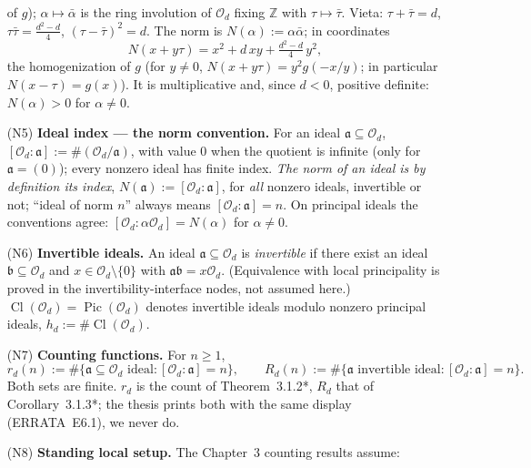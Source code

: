 \begin{definition}
\begin{enumerate}
      of $g$); $\alpha \mapsto \bar\alpha$ is the ring involution of $\mathcal{O}_d$ fixing
      $\mathbb{Z}$ with $\tau \mapsto \bar\tau$. Vieta: $\tau + \bar\tau = d$,
      $\tau\bar\tau = \frac{d^2 - d}{4}$, $(\tau - \bar\tau)^2 = d$. The norm is
      $N(\alpha) := \alpha\bar\alpha$; in coordinates
      \[
        N(x + y\tau) = x^2 + d\,xy + \tfrac{d^2 - d}{4}\,y^2,
      \]
      the homogenization of $g$ (for $y \neq 0$, $N(x + y\tau) = y^2 g(-x/y)$; in
      particular $N(x - \tau) = g(x)$). It is multiplicative and, since $d < 0$, positive
      definite: $N(\alpha) > 0$ for $\alpha \neq 0$.
    \item[(N5)] \textbf{Ideal index --- the norm convention.} For an ideal
      $\mathfrak{a} \subseteq \mathcal{O}_d$,
      $[\mathcal{O}_d : \mathfrak{a}] := \#(\mathcal{O}_d/\mathfrak{a})$, with value $0$
      when the quotient is infinite (only for $\mathfrak{a} = (0)$); every nonzero ideal
      has finite index. \emph{The norm of an ideal is by definition its index},
      $N(\mathfrak{a}) := [\mathcal{O}_d : \mathfrak{a}]$, for \emph{all} nonzero ideals,
      invertible or not; ``ideal of norm $n$'' always means
      $[\mathcal{O}_d : \mathfrak{a}] = n$. On principal ideals the conventions agree:
      $[\mathcal{O}_d : \alpha\mathcal{O}_d] = N(\alpha)$ for $\alpha \neq 0$.
    \item[(N6)] \textbf{Invertible ideals.} An ideal $\mathfrak{a} \subseteq \mathcal{O}_d$
      is \emph{invertible} if there exist an ideal $\mathfrak{b} \subseteq \mathcal{O}_d$
      and $x \in \mathcal{O}_d \setminus \{0\}$ with
      $\mathfrak{a}\mathfrak{b} = x\mathcal{O}_d$. (Equivalence with local principality is
      proved in the invertibility-interface nodes, not assumed here.)
      $\operatorname{Cl}(\mathcal{O}_d) = \operatorname{Pic}(\mathcal{O}_d)$ denotes
      invertible ideals modulo nonzero principal ideals,
      $h_d := \#\operatorname{Cl}(\mathcal{O}_d)$.
    \item[(N7)] \textbf{Counting functions.} For $n \geq 1$,
      \[
        r_d(n) := \#\{\mathfrak{a} \subseteq \mathcal{O}_d \text{ ideal} :
          [\mathcal{O}_d : \mathfrak{a}] = n\}, \qquad
        R_d(n) := \#\{\mathfrak{a} \text{ invertible ideal} :
          [\mathcal{O}_d : \mathfrak{a}] = n\}.
      \]
      Both sets are finite. $r_d$ is the count of Theorem~3.1.2*, $R_d$ that of
      Corollary~3.1.3*; the thesis prints both with the same display (ERRATA~E6.1), we
      never do.
    \item[(N8)] \textbf{Standing local setup.} The Chapter~3 counting results assume:

\end{enumerate}
\end{definition}
